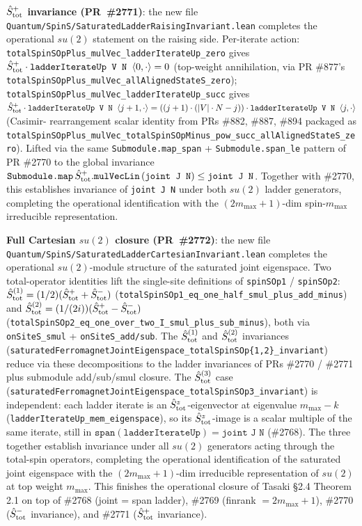 \documentclass[a4paper,11pt]{article}
\begin{document}
\textbf{$\hat S^+_{\rm tot}$ invariance (PR~\#2771)}: the new file
\texttt{Quantum/SpinS/SaturatedLadderRaisingInvariant.lean}
completes the operational $su(2)$ statement on the raising side.
Per-iterate action:
\texttt{totalSpinSOpPlus\_mulVec\_ladderIterateUp\_zero} gives
$\hat S^+_{\rm tot}\cdot\texttt{ladderIterateUp V N }\langle 0,
\cdot\rangle = 0$ (top-weight annihilation, via PR \#877's
\texttt{totalSpinSOpPlus\_mulVec\_allAlignedStateS\_zero});
\texttt{totalSpinSOpPlus\_mulVec\_ladderIterateUp\_succ} gives
$\hat S^+_{\rm tot}\cdot\texttt{ladderIterateUp V N }\langle j+1,
\cdot\rangle = ((j+1)\cdot(|V|\cdot N - j))\cdot
\texttt{ladderIterateUp V N }\langle j, \cdot\rangle$ (Casimir-
rearrangement scalar identity from PRs \#882, \#887, \#894 packaged
as
\texttt{totalSpinSOpPlus\_mulVec\_totalSpinSOpMinus\_pow\_succ\_allAlignedStateS\_zero}).
Lifted via the same
\texttt{Submodule.map\_span} + \texttt{Submodule.span\_le} pattern
of PR \#2770 to the global invariance
$\texttt{Submodule.map}\,\hat S^+_{\rm tot}.\texttt{mulVecLin}\,
(\texttt{joint J N}) \le \texttt{joint J N}$. Together with
\#2770, this establishes invariance of \texttt{joint J N} under
both $su(2)$ ladder generators, completing the operational
identification with the $(2m_{\max}+1)$-dim spin-$m_{\max}$
irreducible representation.

\textbf{Full Cartesian $su(2)$ closure (PR~\#2772)}: the new file
\texttt{Quantum/SpinS/SaturatedLadderCartesianInvariant.lean}
completes the operational $su(2)$-module structure of the
saturated joint eigenspace. Two total-operator identities lift the
single-site definitions of \texttt{spinSOp1} / \texttt{spinSOp2}:
$\hat S^{(1)}_{\rm tot} = (1/2)(\hat S^+_{\rm tot} +
\hat S^-_{\rm tot})$
(\texttt{totalSpinSOp1\_eq\_one\_half\_smul\_plus\_add\_minus}) and
$\hat S^{(2)}_{\rm tot} = (1/(2 i))(\hat S^+_{\rm tot} -
\hat S^-_{\rm tot})$
(\texttt{totalSpinSOp2\_eq\_one\_over\_two\_I\_smul\_plus\_sub\_minus}),
both via \texttt{onSiteS\_smul} + \texttt{onSiteS\_add/sub}.
The $\hat S^{(1)}_{\rm tot}$ and $\hat S^{(2)}_{\rm tot}$
invariances
(\texttt{saturatedFerromagnetJointEigenspace\_totalSpinSOp\{1,2\}\_invariant})
reduce via these decompositions to the ladder invariances of PRs
\#2770 / \#2771 plus submodule add/sub/smul closure. The
$\hat S^{(3)}_{\rm tot}$ case
(\texttt{saturatedFerromagnetJointEigenspace\_totalSpinSOp3\_invariant})
is independent: each ladder iterate is an
$\hat S^z_{\rm tot}$-eigenvector at eigenvalue $m_{\max}-k$
(\texttt{ladderIterateUp\_mem\_eigenspace}), so its
$\hat S^z_{\rm tot}$-image is a scalar multiple of the same
iterate, still in $\texttt{span}(\texttt{ladderIterateUp}) =
\texttt{joint J N}$ (\#2768). The three together establish
invariance under all $su(2)$ generators acting through the
total-spin operators, completing the operational identification of
the saturated joint eigenspace with the $(2m_{\max}+1)$-dim
irreducible representation of $su(2)$ at top weight $m_{\max}$.
This finishes the operational closure of Tasaki §2.4 Theorem 2.1
on top of \#2768 (joint = span ladder), \#2769 (finrank
$= 2m_{\max}+1$), \#2770 ($\hat S^-_{\rm tot}$ invariance), and
\#2771 ($\hat S^+_{\rm tot}$ invariance).
\end{document}
